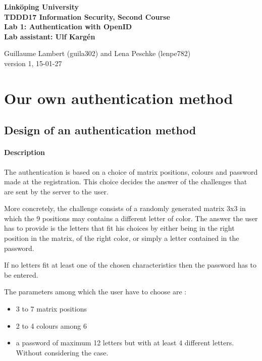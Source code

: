 \documentclass[11pt,a4paper]{article}
\begin{document}
	
\begin{center}
{\bfseries
Linköping University\\
TDDD17 Information Security, Second Course\\

Lab 1: Authentication with OpenID\\
Lab assistant: Ulf Kargén\\[10pt]}

Guillaume Lambert (guila302) and Lena Peschke (lenpe782)\\
version 1, 15-01-27
\end{center}

\hrulefill


\section*{Our own authentication method}
\subsection*{Design of an authentication method}
\paragraph{Description}

The authentication is based on a choice of matrix positions, colours and password made at the registration.
This choice decides the answer of the challenges that are sent by the server to the user.

More concretely, the challenge consists of a randomly generated matrix 3x3 in which the 9 positions may contains a
different letter of color. The answer the user has to provide is the letters that fit his choices by either being in the
right position in the matrix, of the right color, or simply a letter contained in the password.

If no letters fit at least one of the chosen characteristics then the password has to be entered.

The parameters among which the user have to choose are :
\begin{itemize}
\item 3 to 7 matrix positions
\item 2 to 4 colours among 6
\item a password of maximum 12 letters but with at least 4 different letters. Without considering the case.
\end{itemize}
\end{document}

